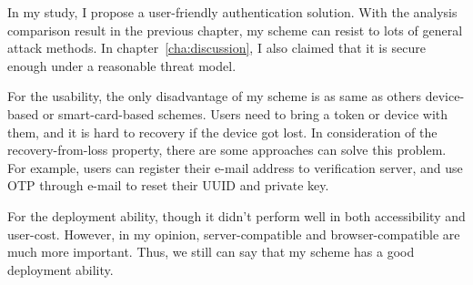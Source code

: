 \begin{CJK}{Bg5}{bsmi}
In my study, I propose a user-friendly authentication solution. With the analysis comparison result in the previous chapter, my scheme can resist to lots of general attack methods. In chapter~\ref{cha:discussion}, I also claimed that it is secure enough under a reasonable threat model. 

For the usability, the only disadvantage of my scheme is as same as others device-based or smart-card-based schemes. Users need to bring a token or device with them, and it is hard to recovery if the device got lost. In consideration of the recovery-from-loss property, there are some approaches can solve this problem. For example, users can register their e-mail address to verification server, and use OTP through e-mail to reset their UUID and private key.

For the deployment ability, though it didn't perform well in both accessibility and user-cost. However, in my opinion, server-compatible and browser-compatible are much more important. Thus, we still can say that my scheme has a good deployment ability.

\end{CJK}